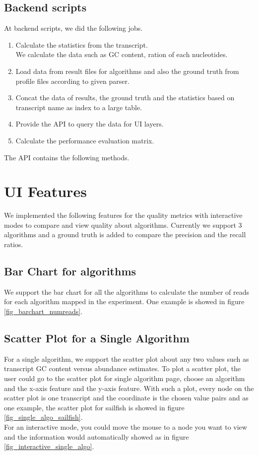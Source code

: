 \documentclass[11pt,letter]{article}
\begin{document}
\subsection {Backend scripts}
At backend scripts, we did the following jobs.
\begin{enumerate}
\item Calculate the statistics from the transcript. \\
We calculate the data such as GC content, ration of each nucleotides.
\item Load data from result files for algorithms and also the ground truth from profile files according to given parser.
\item Concat the data of results, the ground truth and the statistics based on transcript name as index to a large table.
\item Provide the API to query the data for UI layers.
\item Calculate the performance evaluation matrix.
\end{enumerate}
The API contains the following methods.

\section {UI Features}
We implemented the following features for the quality metrics with interactive modes to compare and view quality about algorithms. Currently we support 3 algorithms and a ground truth is added to compare the precision and the recall ratios.
\subsection {Bar Chart for algorithms}
We support the bar chart for all the algorithms to calculate the number of reads for each algorithm mapped in the experiment. One example is showed in figure \ref{fig_barchart_numreads}.

\subsection {Scatter Plot for a Single Algorithm}
For a single algorithm, we support the scatter plot about any two values such as transcript GC content versus abundance estimates. To plot a scatter plot, the user could go to the scatter plot for single algorithm page, choose an algorithm and the x-axis feature and the y-axis feature. With such a plot, every node on the scatter plot is one transcript and the coordinate is the chosen value pairs and as one example, the scatter plot for sailfish is showed in figure \ref{fig_single_algo_sailfish}. \\
For an interactive mode, you could move the mouse to a node you want to view and the information would automatically showed as in figure \ref{fig_interactive_single_algo}.
\end{document}
